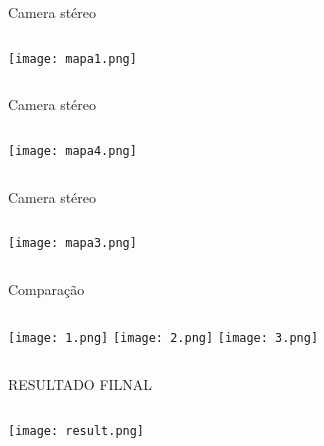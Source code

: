 \begin{frame}[t]{Camera stéreo}
    \transboxout[duration=0.5]
    \begin{columns}
            \texttt{[image: mapa1.png]}
    \end{columns}
\end{frame}
\begin{frame}[t]{Camera stéreo}
    \transboxout[duration=0.5]
    \begin{columns}
            \texttt{[image: mapa4.png]}
    \end{columns}
\end{frame}
\begin{frame}[t]{Camera stéreo}
    \transboxout[duration=0.5]
    \begin{columns}
            \texttt{[image: mapa3.png]}
    \end{columns}
\end{frame}
\begin{frame}[t]{Comparação}
    \transboxout[duration=0.5]
    \begin{columns}
            \texttt{[image: 1.png]}
            \texttt{[image: 2.png]}
            \texttt{[image: 3.png]}
    \end{columns}
\end{frame}
\begin{frame}[t]{RESULTADO FILNAL}
    \transboxout[duration=0.5]
    \begin{columns}
            \texttt{[image: result.png]}
    \end{columns}
\end{frame}
